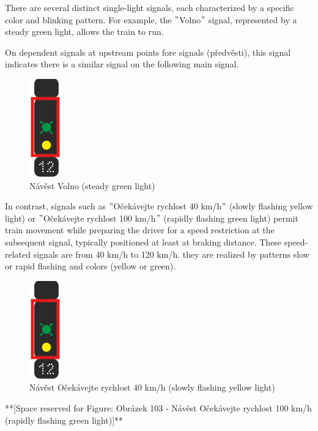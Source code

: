 \documentclass[english, ing, kiv, he, iso690alph, pdf, viewonly]{fasthesis}
\begin{document}
There are several distinct single-light signals, each characterized by a specific color and blinking pattern.
For example, the \("\)Volno\("\) signal, represented by a steady green light, allows the train to run.

On dependent signals at upstream points fore signals (předvěsti), this signal indicates there is  a similar signal on the following main signal.
\begin{figure}[!ht]
    \centering
    \includegraphics[width=0.1\linewidth]{myimgs/example_roi.png}
    \caption{ Návěst Volno (steady green light)}
    \label{fig:Návěst Volno}
\end{figure}
In contrast, signals such as \("\)Očekávejte rychlost 40 km/h\("\) (slowly flashing yellow light) or \("\)Očekávejte rychlost 100 km/h\("\) (rapidly flashing green light) permit train movement while preparing the driver for a speed restriction at the subsequent signal, typically positioned at least at braking distance.
These speed-related signals are from 40 km/h to 120 km/h.
they are realized by patterns slow or rapid flashing and colors (yellow or green).
\begin{figure}[!ht]
    \centering
    \includegraphics[width=0.1\linewidth]{myimgs/example_roi.png}
    \caption{Návěst Očekávejte rychlost 40 km/h (slowly flashing yellow light)}
    \label{fig:figure}
\end{figure}
**[Space reserved for Figure: Obrázek 103 - Návěst Očekávejte rychlost 100 km/h (rapidly flashing green light)]**
\end{document}
